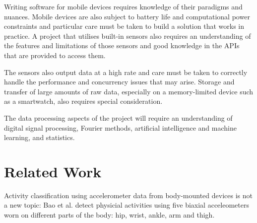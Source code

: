     Writing software for mobile devices requires knowledge of their paradigms and nuances.
    Mobile devices are also subject to battery life and computational power constraints and   
    particular care must be taken to build a solution that works in practice.  
    A project that utilises built-in sensors also requires an understanding of the features and 
    limitations of those sensors and good knowledge in the APIs that are provided to access them.

    The sensors also output data at a high rate and care must be taken to correctly handle the
    performance and concurrency issues that may arise. Storage and transfer of large amounts of
    raw data, especially on a memory-limited device such as a smartwatch, also requires special
    consideration. 
    
    The data processing aspects of the project will require an understanding of digital signal 
    processing, Fourier methods, artificial intelligence and machine learning, and statistics.
  
  \section{Related Work}
  \label{sec:intro-relatedwork}
    Activity classification using accelerometer data from body-mounted devices is not a new topic: 
    Bao et al. \cite{bao2004activity} detect physicial activities using five biaxial acceleometers
    worn on different parts of the body: hip, wrist, ankle, arm and thigh. 
    
